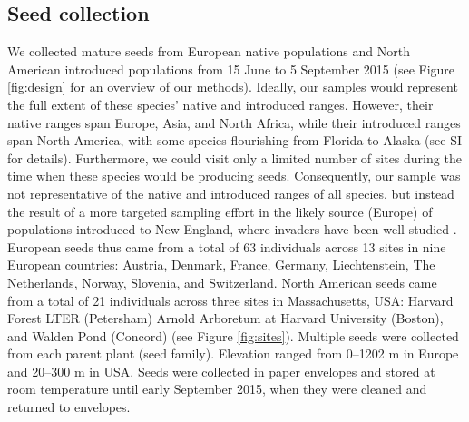 \documentclass[11pt]{article}\usepackage[]{graphicx}\usepackage[]{color}
\begin{document}
	\subsection{Seed collection} 
	We collected mature seeds from European native populations and North American introduced populations from 15 June to 5 September 2015 (see Figure \ref{fig:design} for an overview of our methods).  Ideally, our samples would represent the full extent of these species' native and introduced ranges. However, their native ranges span Europe, Asia, and North Africa, while their introduced ranges span North America, with some species flourishing from Florida to Alaska (see SI for details). Furthermore, we could visit only a limited number of sites during the time when these species would be producing seeds. Consequently, our sample was not representative of the native and introduced ranges of all species, but instead the result of a more targeted sampling effort in the likely source (Europe) of populations introduced to New England, where invaders have been well-studied \parencite{Willis:2008bf}. European seeds thus came from a total of 63 individuals across 13 sites in nine European countries: Austria, Denmark, France, Germany, Liechtenstein, The Netherlands, Norway, Slovenia, and Switzerland.  North American seeds came from a total of 21 individuals across three sites  in Massachusetts, USA: Harvard Forest LTER (Petersham) Arnold Arboretum at Harvard University (Boston), and Walden Pond (Concord) (see Figure \ref{fig:sites}). Multiple seeds were collected from each parent plant (seed family). Elevation ranged from 0--1202 m in Europe and 20--300 m in USA. Seeds were collected in paper envelopes and stored at room temperature until early September 2015, when they were cleaned and returned to envelopes.  %
	
\end{document}
